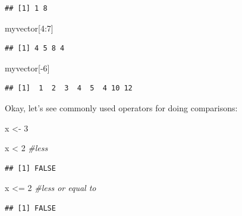 \documentclass[
]{book}
\newenvironment{Shaded}{\begin{snugshade}}{\end{snugshade}}
\newcommand{\CommentTok}[1]{\textcolor[rgb]{0.56,0.35,0.01}{\textit{#1}}}
\newcommand{\DecValTok}[1]{\textcolor[rgb]{0.00,0.00,0.81}{#1}}
\newcommand{\NormalTok}[1]{#1}
\newcommand{\OtherTok}[1]{\textcolor[rgb]{0.56,0.35,0.01}{#1}}
\newcommand{\SpecialCharTok}[1]{\textcolor[rgb]{0.00,0.00,0.00}{#1}}
\begin{document}
\begin{verbatim}
## [1] 1 8
\end{verbatim}

\begin{Shaded}
\begin{Highlighting}[]
\NormalTok{myvector[}\DecValTok{4}\SpecialCharTok{:}\DecValTok{7}\NormalTok{]}
\end{Highlighting}
\end{Shaded}

\begin{verbatim}
## [1] 4 5 8 4
\end{verbatim}

\begin{Shaded}
\begin{Highlighting}[]
\NormalTok{myvector[}\SpecialCharTok{{-}}\DecValTok{6}\NormalTok{]}
\end{Highlighting}
\end{Shaded}

\begin{verbatim}
## [1]  1  2  3  4  5  4 10 12
\end{verbatim}

Okay, let's see commonly used operators for doing comparisons:

\begin{Shaded}
\begin{Highlighting}[]
\NormalTok{x }\OtherTok{\textless{}{-}} \DecValTok{3}
\end{Highlighting}
\end{Shaded}

\begin{Shaded}
\begin{Highlighting}[]
\NormalTok{x }\SpecialCharTok{\textless{}} \DecValTok{2}      \CommentTok{\#less}
\end{Highlighting}
\end{Shaded}

\begin{verbatim}
## [1] FALSE
\end{verbatim}

\begin{Shaded}
\begin{Highlighting}[]
\NormalTok{x }\SpecialCharTok{\textless{}=} \DecValTok{2}     \CommentTok{\#less or equal to}
\end{Highlighting}
\end{Shaded}

\begin{verbatim}
## [1] FALSE
\end{verbatim}
\end{document}

